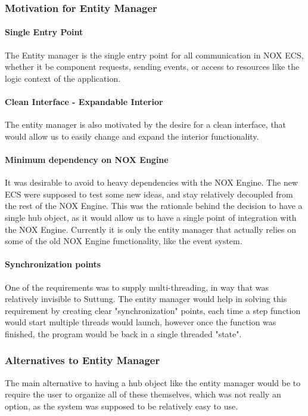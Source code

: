 \subsubsection{Motivation for Entity Manager}
\paragraph{Single Entry Point}
The Entity manager is the single entry point for all communication in NOX ECS,
whether it be component requests, sending events, or access to resources like the
logic context of the application.

\paragraph{Clean Interface - Expandable Interior}
The entity manager is also motivated by the desire for a clean interface, that would
allow us to easily change and expand the interior functionality.

\paragraph{Minimum dependency on NOX Engine}
It was desirable to avoid to heavy dependencies with the NOX Engine.
The new ECS were supposed to test some new ideas, and stay relatively decoupled from
the rest of the NOX Engine.
This was the rationale behind the decision to have a single hub object, as it would allow
us to have a single point of integration with the NOX Engine.
Currently it is only the entity manager that actually relies on some of the old NOX Engine
functionality, like the event system.

\paragraph{Synchronization points}
One of the requirements was to supply multi-threading, in way
that was relatively invisible to Suttung. The entity manager would help in solving this
requirement by creating clear "synchronization" points, each time a step function would start
multiple threads would launch, however once the function was finished, the program would be back
in a single threaded "state".

\subsubsection{Alternatives to Entity Manager}
The main alternative to having a hub object like the entity manager would be to require
the user to organize all of these themselves, which was not really an option,
as the system was supposed to be relatively easy to use.

